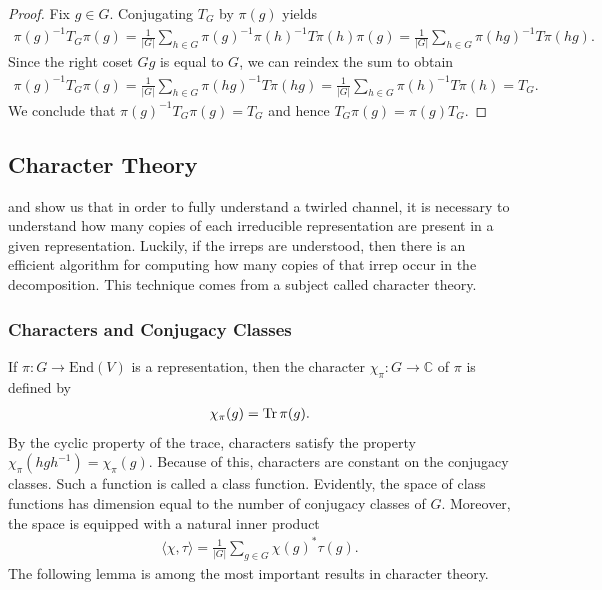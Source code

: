 \begin{proof}
    Fix $g \in G$. Conjugating $T_G$ by $\pi(g)$ yields 
    \begin{align}
        \pi(g)^{-1} T_G \pi(g) = \frac{1}{|G|} \sum_{h \in G} \pi(g)^{-1} \pi(h)^{-1} T \pi(h) \pi(g) = \frac{1}{|G|} \sum_{h \in G} \pi(hg)^{-1} T \pi(hg).
    \end{align}
    Since the right coset $Gg$ is equal to $G$, we can reindex the sum to obtain 
    \begin{align}
        \pi(g)^{-1} T_G \pi(g) = \frac{1}{|G|} \sum_{h \in G} \pi(hg)^{-1} T \pi(hg) = \frac{1}{|G|} \sum_{h \in G} \pi(h)^{-1} T \pi(h) = T_G.
    \end{align}
    We conclude that $\pi(g)^{-1} T_G \pi(g) = T_G$ and hence $T_G \pi(g) = \pi(g) T_G$.
\end{proof}

\subsection{Character Theory}

 and  show us that in order to fully understand a twirled channel, it is necessary to understand how many copies of each irreducible representation are present in a given representation.
Luckily, if the irreps are understood, then there is an efficient algorithm for computing how many copies of that irrep occur in the decomposition.
This technique comes from a subject called character theory.

\subsubsection{Characters and Conjugacy Classes}

If $\pi : G \to \mathrm{End}(V)$ is a representation, then the character $\chi_\pi : G \to \mathbb{C}$ of $\pi$ is defined by 
\begin{align}
    \chi_\pi(g) = \operatorname{\mathrm{Tr}} \pi(g).
\end{align}
By the cyclic property of the trace, characters satisfy the property $\chi_\pi(h g h^{-1}) = \chi_\pi(g)$.
Because of this, characters are constant on the conjugacy classes.
Such a function is called a class function.
Evidently, the space of class functions has dimension equal to the number of conjugacy classes of $G$.
Moreover, the space is equipped with a natural inner product 
\begin{align}
    \langle \chi, \tau \rangle = \frac{1}{|G|} \sum_{g \in G} \chi(g)^* \tau(g).
\end{align}
The following lemma is among the most important results in character theory.

